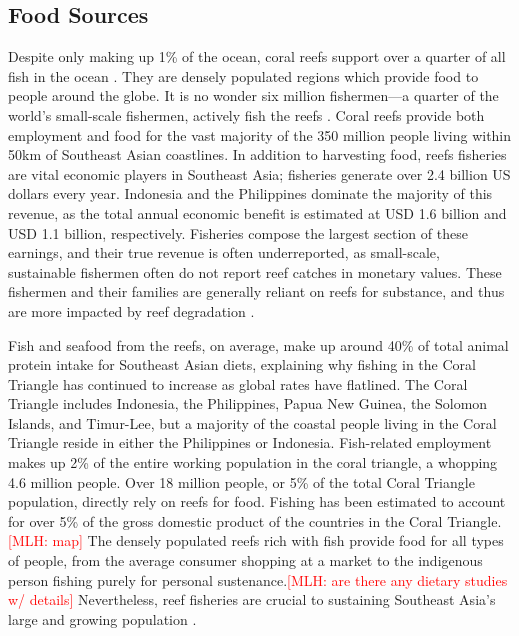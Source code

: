 \documentclass{book}\usepackage{knitr}
\newcommand{\red}[1]{\textcolor{red}{[MLH: #1]}}
\begin{document}
\begin{knitrout}
\begin{kframe}
{\subsection{Food Sources}

Despite only making up 1\% of the ocean, coral reefs support over a quarter of all fish in the ocean \citep{noaa}. They are densely populated regions which provide food to people around the globe. It is no wonder six million fishermen—a quarter of the world's small-scale fishermen, actively fish the reefs \citep{coralreefalliance_2021}. Coral reefs provide both employment and food for the vast majority of the 350 million people living within 50km of Southeast Asian coastlines. In addition to harvesting food, reefs fisheries are vital economic players in Southeast Asia; fisheries generate over 2.4 billion US dollars every year. Indonesia and the Philippines dominate the majority of this revenue, as the total annual economic benefit is estimated at USD 1.6 billion and USD 1.1 billion, respectively.  Fisheries compose the largest section of these earnings, and their true revenue is often underreported, as small-scale, sustainable fishermen often do not report reef catches in monetary values. These fishermen and their families are generally reliant on reefs for substance, and thus are more impacted by reef degradation \citep{RAR}.

Fish and seafood from the reefs, on average, make up around 40\% of total animal protein intake for Southeast Asian diets, explaining why fishing in the Coral Triangle has continued to increase as global rates have flatlined. The Coral Triangle includes Indonesia, the Philippines, Papua New Guinea, the Solomon Islands, and Timur-Lee, but a majority of the coastal people living in the Coral Triangle reside in either the Philippines or Indonesia. Fish-related employment makes up 2\% of the entire working population in the coral triangle, a whopping 4.6 million people. Over 18 million people, or 5\% of the total Coral Triangle population, directly rely on reefs for food. Fishing has been estimated to account for over 5\% of the gross domestic product of the countries in the Coral Triangle.\red{map} The densely populated reefs rich with fish provide food for all types of people, from the average consumer shopping at a market to the indigenous person fishing purely for personal sustenance.\red{are there any dietary studies w/ details} Nevertheless, reef fisheries are crucial to sustaining Southeast Asia’s large and growing population \citep{coraltriangle}.

}
\end{kframe}
\end{knitrout}
\end{document}

